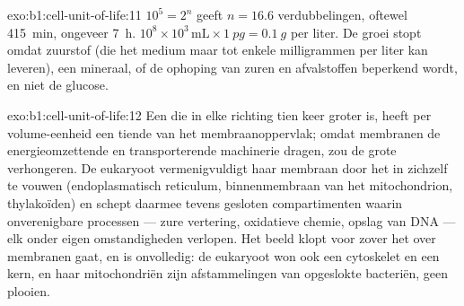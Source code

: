 \begin{solution}{exo:b1:cell-unit-of-life:11}
$10^5 = 2^{n}$ geeft $n = 16.6$ verdubbelingen, oftewel \qty{415}{min}, ongeveer
\qty{7}{h}. $10^8\times 10^3\,\mathrm{mL}\times\qty{1}{pg} = \qty{0.1}{g}$
per liter. De groei stopt omdat zuurstof (die het medium maar tot enkele
milligrammen per liter kan leveren), een mineraal, of de ophoping van zuren en
afvalstoffen beperkend wordt, en niet de glucose.
\end{solution}

\begin{solution}{exo:b1:cell-unit-of-life:12}
Een  die in elke richting tien keer groter is, heeft per volume-eenheid een
tiende van het membraanoppervlak; omdat membranen de energieomzettende en
transporterende machinerie dragen, zou de grote  verhongeren. De eukaryoot
vermenigvuldigt haar membraan door het in zichzelf te vouwen (endoplasmatisch
reticulum, binnenmembraan van het mitochondrion, thylakoïden) en schept daarmee
tevens gesloten compartimenten waarin onverenigbare processen --- zure vertering,
oxidatieve chemie, opslag van DNA --- elk onder eigen omstandigheden verlopen.
Het beeld klopt voor zover het over membranen gaat, en is onvolledig: de
eukaryoot won ook een cytoskelet en een kern, en haar mitochondriën zijn
afstammelingen van opgeslokte bacteriën, geen plooien.
\end{solution}

